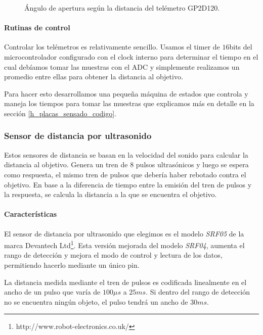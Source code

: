 \begin{figure}[ht]
\begin{minipage}[b]{0.5\linewidth}
		\caption{\'Angulo de apertura seg\'un la distancia del tel\'emetro GP2D120.}
		\label{hF_gp2d120_apertura}
	\end{minipage}
\end{figure}

\paragraph{Rutinas de control}
\label{h_sensado_telemetros_rutinas}

Controlar los tel\'emetros es relativamente sencillo.
Usamos el timer de $16$bits del microcontrolador configurado con el clock interno para determinar el tiempo en el cual
deb\'iamos tomar las muestras con el ADC y simplemente realizamos un promedio entre ellas para obtener la distancia al objetivo.

Para hacer esto desarrollamos una peque\~na m\'aquina de estados que controla y maneja los tiempos para tomar las muestras que
explicamos m\'as en detalle en la secci\'on \ref{h_placas_sensado_codigo}.

\subsubsection{Sensor de distancia por ultrasonido}
\label{h_sensado_ultrasonido}

Estos sensores de distancia se basan en la velocidad del sonido para calcular la distancia al objetivo.
Genera un tren de $8$ pulsos ultras\'onicos y luego se espera como respuesta, el mismo tren de pulsos que deber\'ia haber rebotado contra el objetivo.
En base a la diferencia de tiempo entre la emisi\'on del tren de pulsos y la respuesta, se calcula la distancia a la que se encuentra el objetivo.

\paragraph{Caracter\'isticas}
\label{h_sensado_ultrasonido_caracteristicas}

El sensor de distancia por ultrasonido que elegimos es el modelo \emph{SRF05} de la marca Devantech Ltd\footnote{http://www.robot-electronics.co.uk/}.
Esta versi\'on mejorada del modelo \emph{SRF04}, aumenta el rango de detecci\'on y mejora el modo de control y lectura de los datos, permitiendo
hacerlo mediante un \'unico pin.

La distancia medida mediante el tren de pulsos es codificada linealmente en el ancho de un pulso que var\'ia de $100\mu s$ a $25 ms$.
Si dentro del rango de detecci\'on no se encuentra ning\'un objeto, el pulso tendr\'a un ancho de $30ms$.

